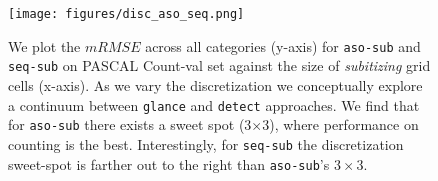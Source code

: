 \documentclass[10pt,twocolumn,letterpaper]{article}
\newcommand{\detect}{\texttt{detect}\xspace}
\newcommand{\sub}{\texttt{aso-sub}\xspace}
\newcommand{\seq}{\texttt{seq-sub}\xspace}
\newcommand{\glance}{\texttt{glance}\xspace}
\begin{document}
\begin{comment}

\begin{figure}
\texttt{[image: figures/continuum]}
\caption{We plot number of cells in a grid for associative subitizing (x-axis) vs mRMSE (y-axis). The shaded region represents the associative subitizing method, which conceptually interpolates between \glance{} and \detect{} approaches. We find that there exists a sweet spot, where performance on counting is the best.} \label{exp:sub-fig}
\vspace{-10pt}
\end{figure}


\subsection{Counting by Glancing (\glance):} As explained in Section.~\ref{sec:exp_setup}, we use: 1) classification vs. detection fine-tuned and 2) 1 hidden layer MLP vs. 2 hidden layer MLP models for \glance{}. On PASCAL we use hidden layers with 500 neurons in each hidden layer. In our COCO model, we replace the second hidden layer with 100 neurons. We find that the  \glance{}\texttt{-nofn-1L}\pdfcomment{what does no-fn-1L mean?} performs the consistently well across both the datasets. In general, additional layers seem to hurt on PASCAL, but not on COCO (probably because of more training data). More details can be found in the supplementary.
\end{comment}




\begin{figure}[t]
\centering
\texttt{[image: figures/disc\_aso\_seq.png]}
\vspace{-4pt}
\caption{\footnotesize{We plot the $mRMSE$ across all categories (y-axis) for \sub and \seq on PASCAL Count-val set against the size of \emph{subitizing} grid cells (x-axis). As we vary the discretization we conceptually explore a
continuum between \glance{} and \detect{} approaches. We find that for \sub there exists a sweet spot (3$\times$3), where performance on counting is the best. Interestingly, for \seq the discretization sweet-spot is farther out to the right than \sub's $3\times3$.}}
\label{exp:sub-fig}
\vspace{-20pt}
\end{figure}
\end{document}
